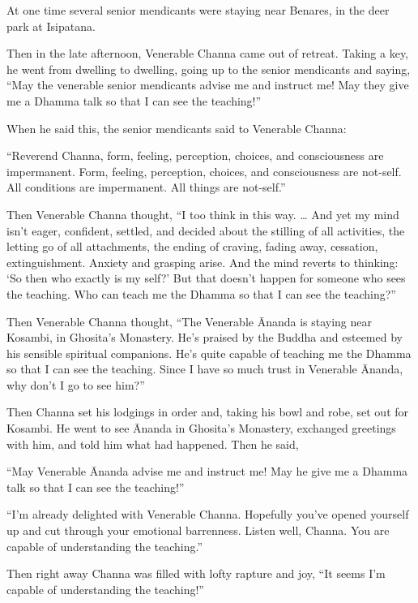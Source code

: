 \documentclass[12pt,openany]{book}%
\begin{document}
At one time several senior mendicants were staying near Benares, in the deer park at Isipatana. 

Then in the late afternoon, Venerable Channa came out of retreat. Taking a key, he went from dwelling to dwelling, going up to the senior mendicants and saying, “May the venerable senior mendicants advise me and instruct me! May they give me a Dhamma talk so that I can see the teaching!” 

When he said this, the senior mendicants said to Venerable Channa: 

“Reverend Channa, form, feeling, perception, choices, and consciousness are impermanent. Form, feeling, perception, choices, and consciousness are not-self. All conditions are impermanent. All things are not-self.” 

Then Venerable Channa thought, “I too think in this way. … And yet my mind isn’t eager, confident, settled, and decided about the stilling of all activities, the letting go of all attachments, the ending of craving, fading away, cessation, extinguishment. Anxiety and grasping arise. And the mind reverts to thinking: ‘So then who exactly is my self?’ But that doesn’t happen for someone who sees the teaching. Who can teach me the Dhamma so that I can see the teaching?” 

Then Venerable Channa thought, “The Venerable Ānanda is staying near Kosambi, in Ghosita’s Monastery. He’s praised by the Buddha and esteemed by his sensible spiritual companions. He’s quite capable of teaching me the Dhamma so that I can see the teaching. Since I have so much trust in Venerable Ānanda, why don’t I go to see him?” 

Then Channa set his lodgings in order and, taking his bowl and robe, set out for Kosambi. He went to see Ānanda in Ghosita’s Monastery, exchanged greetings with him, and told him what had happened. Then he said, 

“May Venerable Ānanda advise me and instruct me! May he give me a Dhamma talk so that I can see the teaching!” 

“I’m already delighted with Venerable Channa. Hopefully you’ve opened yourself up and cut through your emotional barrenness. Listen well, Channa. You are capable of understanding the teaching.” 

Then right away Channa was filled with lofty rapture and joy, “It seems I’m capable of understanding the teaching!” 
\end{document}
